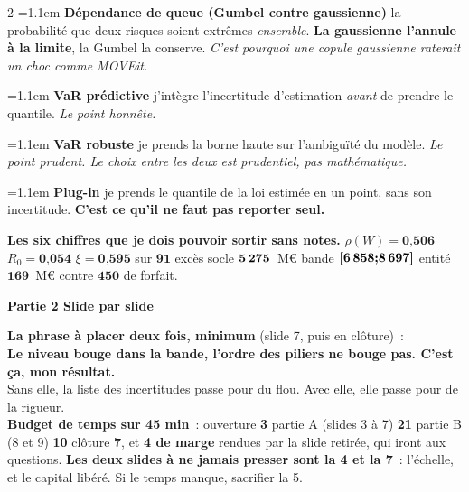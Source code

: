 \documentclass[9pt,a4paper]{article}
\newcommand{\n}[1]{\textbf{#1}}
\newcommand{\dfn}[2]{\noindent\hangindent=1.1em\hangafter=1
  {\color{warm}\bfseries #1} \textemdash{} #2\par\smallskip}
\begin{document}
\begin{multicols}{2}
\dfn{Dépendance de queue (Gumbel contre gaussienne)}{la probabilité que deux risques soient
extrêmes \emph{ensemble}. \n{La gaussienne l'annule à la limite}, la Gumbel la conserve.
\emph{C'est pourquoi une copule gaussienne raterait un choc comme MOVEit.}}

\dfn{VaR prédictive}{j'intègre l'incertitude d'estimation \emph{avant} de prendre le
quantile. \emph{Le point honnête.}}

\dfn{VaR robuste}{je prends la borne haute sur l'ambiguïté du modèle. \emph{Le point
prudent. Le choix entre les deux est prudentiel, pas mathématique.}}

\dfn{Plug-in}{je prends le quantile de la loi estimée en un point, sans son incertitude.
\n{C'est ce qu'il ne faut pas reporter seul.}}

\end{multicols}

\vspace{2pt}
\begin{vertb}
\scriptsize
\textbf{Les six chiffres que je dois pouvoir sortir sans notes.}
$\rho(W)=\n{0{,}506}$ \textbullet{} $R_0=\n{0{,}054}$ \textbullet{} $\xi=\n{0{,}595}$ sur
$\n{91}$ excès \textbullet{} socle $\n{5\,275}$~M\euro{} \textbullet{} bande
$\n{[6\,858;8\,697]}$ \textbullet{} entité $\n{169}$~M\euro{} contre $\n{450}$ de forfait.
\end{vertb}

\newpage

{\color{navy}\large\bfseries Partie 2 \textemdash{} Slide par slide}

\vspace{2pt}
\begin{reflexe}
\textbf{La phrase à placer deux fois, minimum} (slide 7, puis en clôture)~:\\
\textbf{\og Le niveau bouge dans la bande, l'ordre des piliers ne bouge pas. C'est ça, mon
résultat.\fg{}}\\[3pt]
{\footnotesize Sans elle, la liste des incertitudes passe pour du flou. Avec elle, elle passe
pour de la rigueur.}\\[4pt]
{\footnotesize\textbf{Budget de temps sur 45 min}~: ouverture \textbf{3} \textbullet{} partie A
(slides 3 à 7) \textbf{21} \textbullet{} partie B (8 et 9) \textbf{10} \textbullet{} clôture
\textbf{7}, et \textbf{4 de marge} rendues par la slide retirée, qui iront aux questions.
\textbf{Les deux slides à ne jamais presser sont la 4 et la 7}~: l'échelle, et le
capital libéré. Si le temps manque, sacrifier la 5.}
\end{reflexe}
\end{document}
